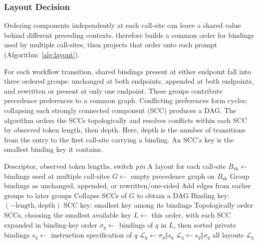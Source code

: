 \subsubsection{Layout Decision}
\label{sec:layout_decision}

Ordering components independently at each call-site can leave a shared value behind different preceding contexts. \sysname therefore builds a common order for bindings used by multiple call-sites, then projects that order onto each prompt (Algorithm~\ref{alg:layout}).

For each workflow transition, shared bindings present at either endpoint fall into three ordered groups: unchanged at both endpoints, appended at both endpoints, and rewritten or present at only one endpoint. These groups contribute precedence preferences to a common graph. Conflicting preferences form cycles; collapsing each strongly connected component (SCC) produces a DAG. The algorithm orders the SCCs topologically and resolves conflicts within each SCC by observed token length, then depth. Here, depth is the number of transitions from the entry to the first call-site carrying a binding. An SCC's key is the smallest binding key it contains.

\begin{algorithm}[t]
\caption{Coordinated prompt layout}
\label{alg:layout}
\begin{algorithmic}[1]
\Require Descriptor, observed token lengths, switch \textit{pin}
\Ensure A layout for each call-site
\State $B_{\mathrm{sh}} \gets$ bindings used at multiple call-sites \label{alg:layout:sh-begin}
\State $G \gets$ empty precedence graph on $B_{\mathrm{sh}}$
    \State Group bindings as unchanged, appended, or rewritten/one-sided
    \State Add edges from earlier groups to later groups
\EndFor
\State Collapse SCCs of $G$ to obtain a DAG
\State Binding key: $(-\mathrm{length},\mathrm{depth})$
\State SCC key: smallest key among its bindings
\State Topologically order SCCs, choosing the smallest available key
\State $L \gets$ this order, with each SCC expanded in binding-key order \label{alg:layout:sh-end}
    \State $\sigma_q \gets$ bindings of $q$ in $L$, then sorted private bindings \label{alg:layout:pv}
    \State $s_q \gets$ instruction specification of $q$ \label{alg:layout:spec-begin}
        \State $\mathcal{L}_q \gets \sigma_q\Vert s_q$
    \Else
        \State $\mathcal{L}_q \gets s_q\Vert\sigma_q$ \label{alg:layout:spec-end}
    \EndIf
\EndFor
\State \Return all layouts $\mathcal{L}_q$
\end{algorithmic}
\end{algorithm}

